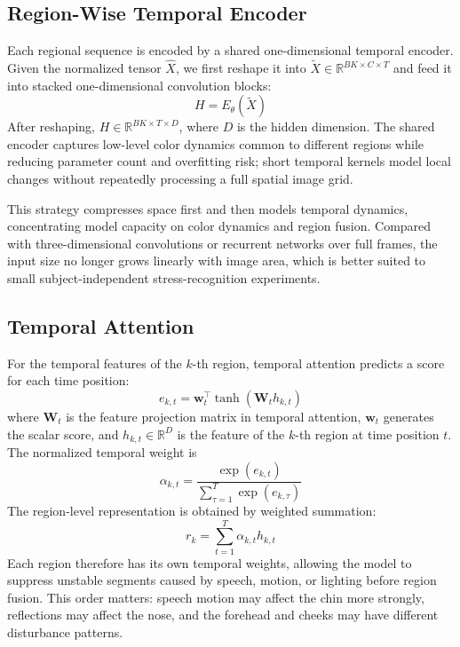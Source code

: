 \documentclass[runningheads]{llncs}
\begin{document}
\subsection{Region-Wise Temporal Encoder}

Each regional sequence is encoded by a shared one-dimensional temporal encoder. Given the normalized tensor $\hat{X}$, we first reshape it into $\tilde{X} \in \mathbb{R}^{B K \times C \times T}$ and feed it into stacked one-dimensional convolution blocks:
\begin{equation}
    H = E_{\theta}(\tilde{X})
\end{equation}
After reshaping, $H \in \mathbb{R}^{B K \times T \times D}$, where $D$ is the hidden dimension. The shared encoder captures low-level color dynamics common to different regions while reducing parameter count and overfitting risk; short temporal kernels model local changes without repeatedly processing a full spatial image grid.

This strategy compresses space first and then models temporal dynamics, concentrating model capacity on color dynamics and region fusion. Compared with three-dimensional convolutions or recurrent networks over full frames, the input size no longer grows linearly with image area, which is better suited to small subject-independent stress-recognition experiments.

\subsection{Temporal Attention}

For the temporal features of the $k$-th region, temporal attention predicts a score for each time position:
\begin{equation}
    e_{k,t} = \mathbf{w}_t^\top \tanh(\mathbf{W}_t h_{k,t})
\end{equation}
where $\mathbf{W}_t$ is the feature projection matrix in temporal attention, $\mathbf{w}_t$ generates the scalar score, and $h_{k,t} \in \mathbb{R}^{D}$ is the feature of the $k$-th region at time position $t$. The normalized temporal weight is
\begin{equation}
    \alpha_{k,t} = \frac{\exp(e_{k,t})}{\sum_{\tau=1}^{T}\exp(e_{k,\tau})}
\end{equation}
The region-level representation is obtained by weighted summation:
\begin{equation}
    r_k = \sum_{t=1}^{T}\alpha_{k,t} h_{k,t}
\end{equation}
Each region therefore has its own temporal weights, allowing the model to suppress unstable segments caused by speech, motion, or lighting before region fusion. This order matters: speech motion may affect the chin more strongly, reflections may affect the nose, and the forehead and cheeks may have different disturbance patterns.
\end{document}

